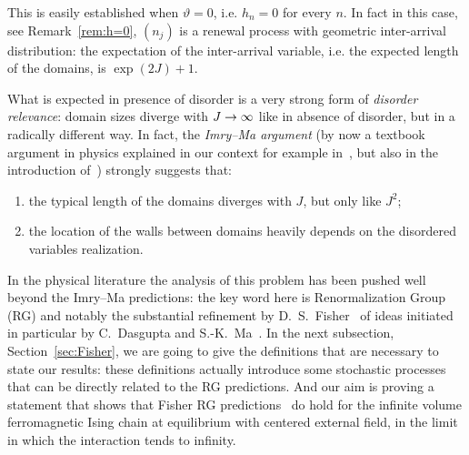 \documentclass[10pt]{amsart}
\theoremstyle{definition}\newtheorem{defi}[theo]{Definition}\newtheorem{rema}[theo]{Remark}\newtheorem{exam}[theo]{Example}\newtheorem{exem}[theo]{Example}\newtheorem{nota}[theo]{Notation}
\renewcommand*{\to}{\mathchoice{\longrightarrow}{\rightarrow}{\rightarrow}{\rightarrow}}
\begin{document}
This is easily established when $\vartheta =0$, i.e. $h_n=0$ for every $n$. In fact in this case, see Remark~\ref{rem:h=0}, $(n_j)$ is a renewal process with geometric inter-arrival distribution: the expectation of the inter-arrival variable, i.e. the expected length of the domains, is $\exp(2J)+1$.


What is expected in presence of disorder is a very strong form of \emph{disorder relevance}: domain sizes diverge with $J\to \infty$ like in absence of disorder, but in a radically different way. In fact, the \emph{Imry--Ma argument} (by now a textbook argument in physics explained in our context for example in~\cite[p.~373]{cf:IM}, but also in the introduction of~\cite{cf:CGH1}) strongly suggests that:
\begin{enumerate}
\item the typical length of the domains diverges with $J$, but only like $J^2$;
\item the location of the walls between domains heavily depends on the disordered variables realization.
\end{enumerate}

In the physical literature the analysis of this problem has been pushed well beyond the Imry--Ma predictions: the key word here is Renormalization Group (RG) and notably the substantial refinement by D.~S.~Fisher~\cite{cf:F92,cf:F95} of ideas initiated in particular by C.~Dasgupta and S.-K.~Ma~\cite{DM}. In the next subsection, Section~\ref{sec:Fisher}, we are going to give the definitions that are necessary to state our results: these definitions actually introduce some stochastic processes that can be directly related to the RG predictions. And our aim is proving a statement that shows that Fisher RG predictions~\cite{cf:FLDM01} do hold for the infinite volume ferromagnetic Ising chain at equilibrium with centered external field, in the limit in which the interaction tends to infinity.
\end{document}
